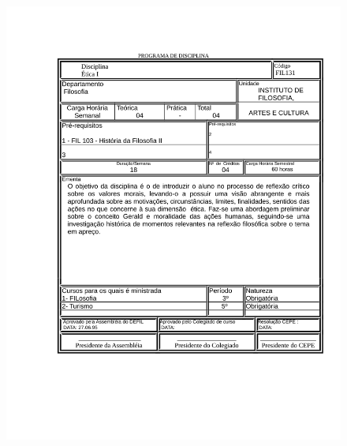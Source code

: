 \begin{figure}[p]
	\centering 
	\includegraphics[scale=0.7]{capitulos/anexo1-programas-disciplina/eg39.pdf}
\end{figure}

